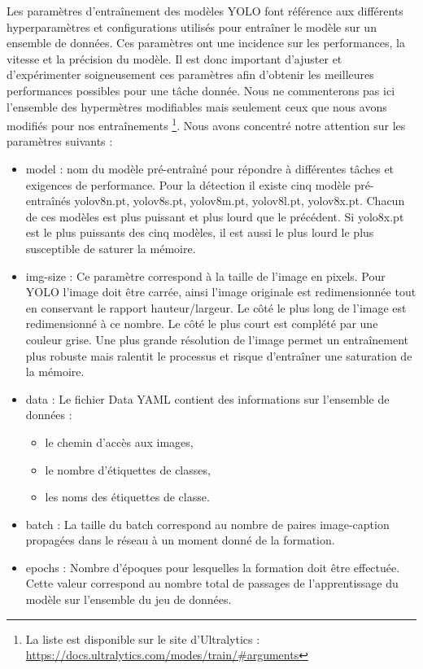\documentclass[12pt,twoside]{book}
\begin{document}
Les paramètres d'entraînement des modèles YOLO font référence aux différents hyperparamètres et configurations utilisés pour entraîner le modèle sur un ensemble de données. Ces paramètres ont une incidence sur les performances, la vitesse et la précision du modèle. Il est donc important d'ajuster et d'expérimenter soigneusement ces paramètres afin d'obtenir les meilleures performances possibles pour une tâche donnée. Nous ne commenterons pas ici l’ensemble des hypermètres modifiables mais seulement ceux que nous avons modifiés pour nos entraînements \footnote{La liste est disponible sur le site d’Ultralytics : \url{https://docs.ultralytics.com/modes/train/\#arguments}}. Nous avons concentré notre attention sur les paramètres suivants : \\
\begin{itemize}
    \item model : nom du modèle pré-entraîné pour répondre à différentes tâches et exigences de performance. Pour la détection il existe cinq modèle pré-entraînés yolov8n.pt, yolov8s.pt, yolov8m.pt, yolov8l.pt, yolov8x.pt. Chacun de ces modèles est plus puissant et plus lourd que le précédent. Si yolo8x.pt est le plus puissants des cinq modèles, il est aussi le plus lourd le plus susceptible de saturer la mémoire. 
    \item img-size : Ce paramètre correspond à la taille de l'image en pixels. Pour YOLO l'image doit être carrée, ainsi l'image originale est redimensionnée tout en conservant le rapport hauteur/largeur. Le côté le plus long de l'image est redimensionné à ce nombre. Le côté le plus court est complété par une couleur grise. Une plus grande résolution de l’image permet un entraînement plus robuste mais ralentit le processus et risque d’entraîner une saturation de la mémoire. 
    \item data : Le fichier Data YAML contient des informations sur l'ensemble de données : 
    \begin{itemize}
        \item le chemin d'accès aux images,
        \item le nombre d'étiquettes de classes,
        \item les noms des étiquettes de classe.
    \end{itemize}
    \item batch : La taille du batch correspond au nombre de paires image-caption propagées dans le réseau à un moment donné de la formation. 
    \item epochs : Nombre d'époques pour lesquelles la formation doit être effectuée. Cette valeur correspond au nombre total de passages de l'apprentissage du modèle sur l'ensemble du jeu de données.

\end{itemize}
\end{document}
